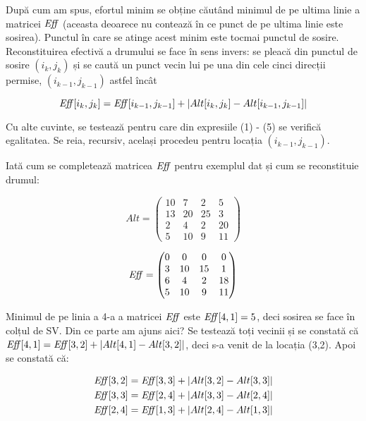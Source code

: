 După cum am spus, efortul minim se obține căutând minimul de pe ultima linie a
matricei $\mathit{Eff}$ (aceasta deoarece nu contează în ce punct de pe ultima linie
este sosirea). Punctul în care se atinge acest minim este tocmai punctul de
sosire. Reconstituirea efectivă a drumului se face în sens invers: se pleacă
din punctul de sosire $(i_k,j_k)$ și se caută un punct vecin lui pe una din
cele cinci direcții permise, $(i_{k-1},j_{k-1})$ astfel încât

\begin{equation}
  \mathit{Eff}[i_k,j_k] = \mathit{Eff}[i_{k-1},j_{k-1}] + |Alt[i_k,j_k] - Alt[i_{k-1},j_{k-1}]|
\end{equation}

Cu alte cuvinte, se testează pentru care din expresiile (1) - (5) se verifică
egalitatea. Se reia, recursiv, același procedeu pentru locația
$(i_{k-1},j_{k-1})$.

Iată cum se completează matricea $\mathit{Eff}$ pentru exemplul dat și cum se
reconstituie drumul:

\begin{equation}
  Alt =
  \begin{pmatrix}
    10 &  7 &  2 &  5 \\
    13 & 20 & 25 &  3 \\
    2 &  4 &  2 & 20 \\
    5 & 10 &  9 & 11
  \end{pmatrix}
\end{equation}

\begin{equation}
  \mathit{Eff} =
  \begin{pmatrix}
    0 &  0 &  0 &  0 \\
    3 & 10 & 15 &  1 \\
    6 &  4 &  2 & 18 \\
    5 & 10 &  9 & 11
  \end{pmatrix}
\end{equation}

Minimul de pe linia a 4-a a matricei $\mathit{Eff}$ este $\mathit{Eff}[4,1]=5$, deci sosirea se
face în colțul de SV. Din ce parte am ajuns aici? Se testează toți vecinii și
se constată că $\mathit{Eff}[4,1] = \mathit{Eff}[3,2] + |Alt[4,1] - Alt[3,2]|$, deci s-a venit
de la locația (3,2). Apoi se constată că:

\begin{equation}
  \begin{split}
    \mathit{Eff}[3,2] & = \mathit{Eff}[3,3] + |Alt[3,2] - Alt[3,3]| \\
    \mathit{Eff}[3,3] & = \mathit{Eff}[2,4] + |Alt[3,3] - Alt[2,4]| \\
    \mathit{Eff}[2,4] & = \mathit{Eff}[1,3] + |Alt[2,4] - Alt[1,3]| \\
  \end{split}
\end{equation}

